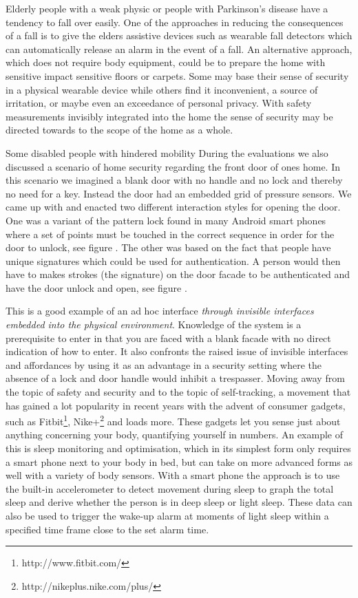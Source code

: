 Elderly people with a weak physic or people with Parkinson's disease have a tendency to fall over easily.
One of the approaches in reducing the consequences of a fall is to give the elders assistive devices such as wearable fall detectors which can automatically release an alarm in the event of a fall.
An alternative approach, which does not require body equipment, could be to prepare the home with sensitive impact sensitive floors or carpets.
Some may base their sense of security in a physical wearable device while others find it inconvenient, a source of irritation, or maybe even an exceedance of personal privacy. 
With safety measurements invisibly integrated into the home the sense of security may be directed towards to the scope of the home as a whole.

Some disabled people with hindered mobility 
\blank
During the evaluations we also discussed a scenario of home security regarding the front door of ones home.
In this scenario we imagined a blank door with no handle and no lock and thereby no need for a key.
Instead the door had an embedded grid of pressure sensors.
We came up with and enacted two different interaction styles for opening the door.
One was a variant of the pattern lock found in many Android smart phones where a set of points must be touched in the correct sequence in order for the door to unlock, see figure .
The other was based on the fact that people have unique signatures which could be used for authentication.
A person would then have to makes strokes (the signature) on the door facade to be authenticated and have the door unlock and open, see figure .

This is a good example of an ad hoc interface \emph{through invisible interfaces embedded into the physical environment}.
Knowledge of the system is a prerequisite to enter in that you are faced with a blank facade with no direct indication of how to enter.
It also confronts the raised issue of invisible interfaces and affordances by using it as an advantage in a security setting where the absence of a lock and door handle would inhibit a trespasser.
\blank
Moving away from the topic of safety and security and to the topic of self-tracking, a movement that has gained a lot popularity in recent years with the advent of consumer gadgets, such as Fitbit\footnote{http://www.fitbit.com/}, Nike+\footnote{http://nikeplus.nike.com/plus/} and loads more. 
These gadgets let you sense just about anything concerning your body, quantifying yourself in numbers.
An example of this is sleep monitoring and optimisation, which in its simplest form only requires a smart phone next to your body in bed, but can take on more advanced forms as well with a variety of body sensors.
With a smart phone the approach is to use the built-in accelerometer to detect movement during sleep to graph the total sleep and derive whether the person is in deep sleep or light sleep.
These data can also be used to trigger the wake-up alarm at moments of light sleep within a specified time frame close to the set alarm time.

